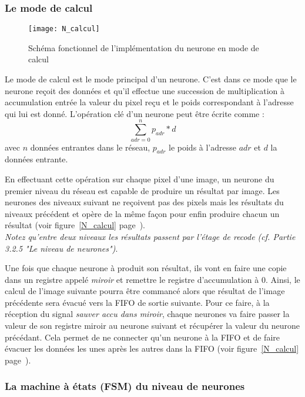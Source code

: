 	\subsubsection{Le mode de calcul}
	\begin{figure}[h!]
		\begin{center}
			\texttt{[image: N\_calcul]}
			\caption{Schéma fonctionnel de l'implémentation du neurone en mode de calcul}
			\label{fig:N_calcul}
		\end{center}
	\end{figure}

	Le mode de calcul est le mode principal d'un neurone. C'est dans ce mode que le neurone
	reçoit des données et qu'il effectue une succession de multiplication à accumulation entrée
	la valeur du pixel reçu et le poids correspondant à l'adresse qui lui est donné. L'opération clé
	d'un neurone peut être écrite comme :
	$$\sum_{adr=0}^n p_{adr}*d$$
	avec $n$ données entrantes dans le réseau, $p_{adr}$ le poids à l'adresse $adr$
	et $d$ la données entrante.

	En effectuant cette opération sur chaque pixel d'une image, un neurone du premier niveau du réseau
	est capable de produire un résultat par image. Les neurones des niveaux suivant ne reçoivent
	pas des pixels mais les résultats du niveaux précédent et opère de la même façon pour enfin
	produire chacun un résultat (voir figure~\ref{N_calcul} page~\pageref{N_calcul}).
	\\{\em Notez qu'entre deux niveaux les résultats passent par l'étage de recode
	(cf. Partie 3.2.5 "Le niveau de neurones")}.

	Une fois que chaque neurone à produit son résultat, ils vont en faire une copie dans
	un registre appelé {\em miroir} et remettre le registre d'accumulation à 0. Ainsi,
	le calcul de l'image suivante pourra être commancé alors que résultat de l'image précédente
	sera évacué vers la FIFO de sortie suivante. Pour ce faire, à la réception du signal
	{\em sauver accu dans miroir}, chaque neurones va faire passer la valeur de son
	registre miroir au neurone suivant et récupérer la valeur du neurone précédant.
	Cela permet de ne connecter qu'un neurone à la FIFO
	et de faire évacuer les données les unes après les autres dans la FIFO
	(voir figure~\ref{N_calcul} page~\pageref{N_calcul}).

\subsubsection{La machine à états (FSM) du niveau de neurones}

